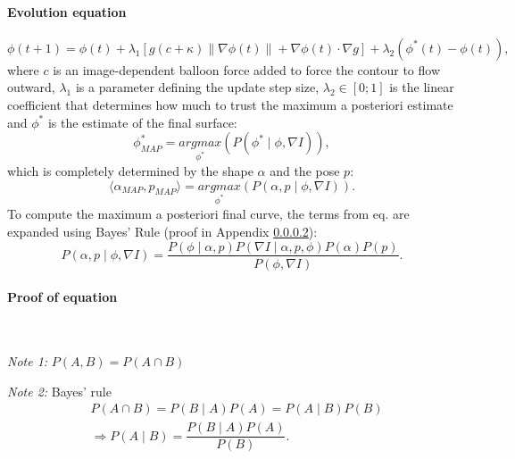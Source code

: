 \paragraph{Evolution equation}
\begin{equation}
  \label{eq:dphidt-leventon}
  \phi(t+1) = \phi(t) + \lambda_1[g(c + \kappa) \|\nabla\phi(t)\| + \nabla\phi(t)\cdot\nabla g] + \lambda_2(\phi^\ast(t) - \phi(t)),
\end{equation}
where $c$ is an image-dependent balloon force added to force the contour to flow outward, $\lambda_1$ is a parameter defining the update step size, $\lambda_2 \in [0;1]$ is the linear coefficient that determines how much to trust the maximum a posteriori estimate and $\phi^\ast$ is the estimate of the final surface:
\begin{equation}
  \label{eq:phi*-leventon}
  \phi_{MAP}^\ast = \underset{\phi^\ast}{argmax}(P(\phi^\ast \; | \; \phi, \nabla I)),
\end{equation}
which is completely determined by the shape $\alpha$ and the pose $p$:
\begin{equation}
  \label{eq:shape-pose-leventon}
  \langle\alpha_{MAP}, p_{MAP}\rangle = \underset{\phi^\ast}{argmax}(P(\alpha, p \; | \; \phi, \nabla I)).
\end{equation}
To compute the maximum a posteriori final curve, the terms from eq.  are expanded using Bayes' Rule (proof in Appendix \ref{par:Proof-MAP-leventon}):
\begin{equation}
  \label{eq:MAP-leventon}
  P(\alpha, p \; | \; \phi, \nabla I) = \frac{P(\phi \; | \; \alpha,p)P(\nabla I \; | \; \alpha, p, \phi)P(\alpha)P(p)}{P(\phi,\nabla I)}.
\end{equation}


\paragraph{Proof of equation }
\label{par:Proof-MAP-leventon}
~\par \vspace{0.3cm}
\emph{Note 1:} $P(A,B) = P(A \cap B)$

\emph{Note 2:} Bayes' rule
\begin{eqnarray}
  \label{eq:sec-bayes}
  & P(A \cap B) = P(B \; | \; A)P(A) = P(A \; | \; B)P(B) \label{eq:sec-bayes1}\\
  & \Rightarrow P(A \; | \; B) = \dfrac{P(B \; | \; A)P(A)}{P(B)} \label{eq:sec-bayes2}.
\end{eqnarray}

